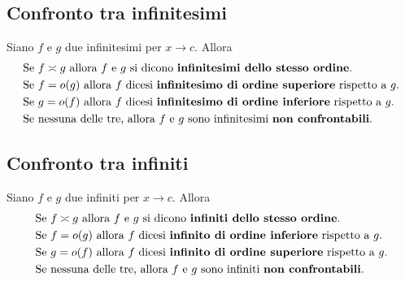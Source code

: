 \documentclass{book}
\begin{document}
\noindent\begin{minipage}{\textwidth}
    \begin{proposition}
        \subsection{Confronto tra infinitesimi}
        Siano \(f\) e \(g\) due infinitesimi per \(x \to c\). Allora
        \begin{align*}
             & \text{Se } f \asymp g \text{ allora } f \text{ e } g \text{ si dicono \textbf{infinitesimi dello stesso ordine}.} \\
             & \text{Se } f = o(g) \text{ allora } f \text{ dicesi \textbf{infinitesimo di ordine superiore} rispetto a } g.     \\
             & \text{Se } g = o(f) \text{ allora } f \text{ dicesi \textbf{infinitesimo di ordine inferiore} rispetto a } g.     \\
             & \text{Se nessuna delle tre, allora } f \text{ e } g \text{ sono infinitesimi \textbf{non confrontabili}.}
        \end{align*}
    \end{proposition}
    \begin{proposition}
        \subsection{Confronto tra infiniti}
        Siano \(f\) e \(g\) due infiniti per \(x \to c\). Allora
        \begin{align*}
             & \text{Se } f \asymp g \text{ allora } f \text{ e } g \text{ si dicono \textbf{infiniti dello stesso ordine}.} \\
             & \text{Se } f = o(g) \text{ allora } f \text{ dicesi \textbf{infinito di ordine inferiore} rispetto a } g.     \\
             & \text{Se } g = o(f) \text{ allora } f \text{ dicesi \textbf{infinito di ordine superiore} rispetto a } g.     \\
             & \text{Se nessuna delle tre, allora } f \text{ e } g \text{ sono infiniti \textbf{non confrontabili}.}
        \end{align*}
    \end{proposition}
    \begin{theorem}

\end{theorem}
\end{minipage}
\end{document}

